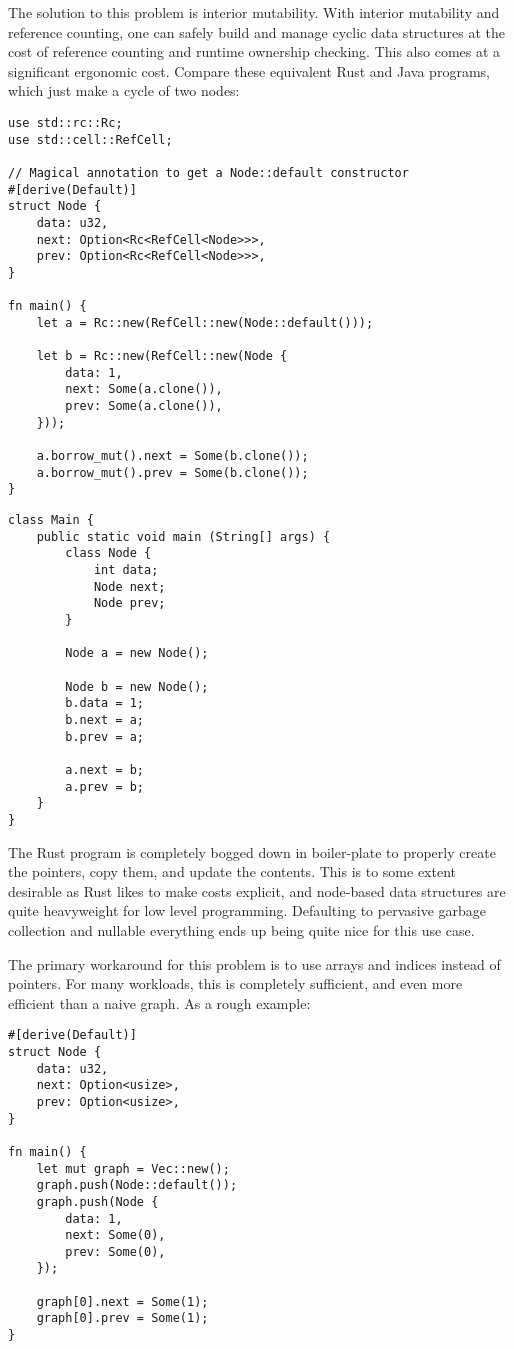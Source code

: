 The solution to this problem is interior mutability. With interior mutability
and reference counting, one can safely build and manage cyclic data structures
at the cost of reference counting and runtime ownership checking. This also
comes at a significant ergonomic cost. Compare these equivalent Rust and
Java programs, which just make a cycle of two nodes:

\begin{verbatim}
use std::rc::Rc;
use std::cell::RefCell;

// Magical annotation to get a Node::default constructor
#[derive(Default)]
struct Node {
    data: u32,
    next: Option<Rc<RefCell<Node>>>,
    prev: Option<Rc<RefCell<Node>>>,
}

fn main() {
    let a = Rc::new(RefCell::new(Node::default()));

    let b = Rc::new(RefCell::new(Node {
        data: 1,
        next: Some(a.clone()),
        prev: Some(a.clone()),
    }));

    a.borrow_mut().next = Some(b.clone());
    a.borrow_mut().prev = Some(b.clone());
}
\end{verbatim}

\begin{verbatim}
class Main {
    public static void main (String[] args) {
        class Node {
            int data;
            Node next;
            Node prev;
        }

        Node a = new Node();

        Node b = new Node();
        b.data = 1;
        b.next = a;
        b.prev = a;

        a.next = b;
        a.prev = b;
    }
}
\end{verbatim}

The Rust program is completely bogged down in boiler-plate to properly create
the pointers, copy them, and update the contents. This is to some extent desirable
as Rust likes to make costs explicit, and node-based data structures are quite
heavyweight for low level programming. Defaulting to pervasive garbage collection
and nullable everything ends up being quite nice for this use case.

The primary workaround for this problem is to use arrays and indices instead of
pointers. For many workloads, this is completely sufficient, and even more
efficient than a naive graph. As a rough example:

\begin{verbatim}
#[derive(Default)]
struct Node {
    data: u32,
    next: Option<usize>,
    prev: Option<usize>,
}

fn main() {
    let mut graph = Vec::new();
    graph.push(Node::default());
    graph.push(Node {
        data: 1,
        next: Some(0),
        prev: Some(0),
    });

    graph[0].next = Some(1);
    graph[0].prev = Some(1);
}
\end{verbatim}

